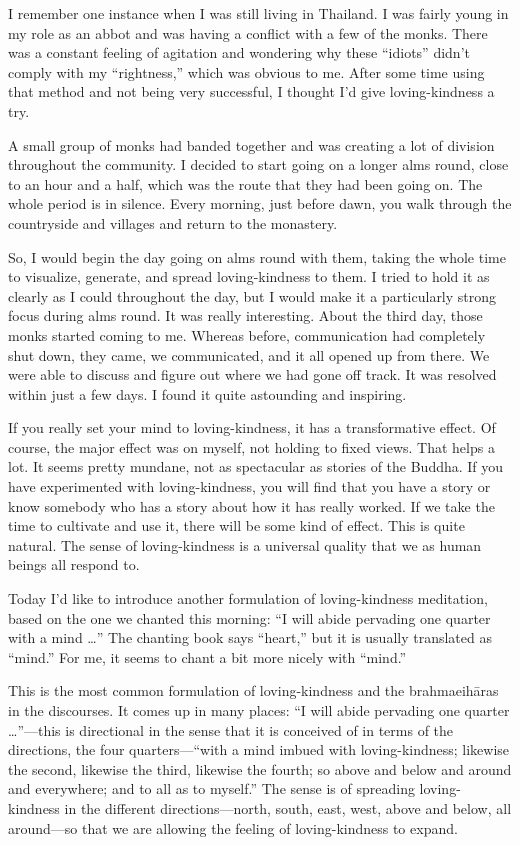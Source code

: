 I remember one instance when I was still living in Thailand. I was
fairly young in my role as an abbot and was having a conflict with a few
of the monks. There was a constant feeling of agitation and wondering
why these “idiots” didn’t comply with my “rightness,” which was obvious
to me. After some time using that method and not being very successful,
I thought I’d give loving-kindness a try.

A small group of monks had banded together and was creating a lot of
division throughout the community. I decided to start going on a longer
alms round, close to an hour and a half, which was the route that they
had been going on. The whole period is in silence. Every morning, just
before dawn, you walk through the countryside and villages and return to
the monastery.

So, I would begin the day going on alms round with them, taking the
whole time to visualize, generate, and spread loving-kindness to them. I
tried to hold it as clearly as I could throughout the day, but I would
make it a particularly strong focus during alms round. It was really
interesting. About the third day, those monks started coming to me.
Whereas before, communication had completely shut down, they came, we
communicated, and it all opened up from there. We were able to discuss
and figure out where we had gone off track. It was resolved within just
a few days. I found it quite astounding and inspiring.

If you really set your mind to loving-kindness, it has a transformative
effect. Of course, the major effect was on myself, not holding to fixed
views. That helps a lot. It seems pretty mundane, not as spectacular as
stories of the Buddha. If you have experimented with loving-kindness,
you will find that you have a story or know somebody who has a story
about how it has really worked. If we take the time to cultivate and use
it, there will be some kind of effect. This is quite natural. The sense
of loving-kindness is a universal quality that we as human beings all
respond to.

Today I’d like to introduce another formulation of loving-kindness
meditation, based on the one we chanted this morning: “I will abide
pervading one quarter with a mind \ldots{}” The chanting book says “heart,”
but it is usually translated as “mind.” For me, it seems to chant a bit
more nicely with “mind.”

This is the most common formulation of loving-kindness and the
brahmaeihāras in the discourses. It comes up in many places: “I will
abide pervading one quarter \ldots{}”—this is directional in the sense that
it is conceived of in terms of the directions, the four quarters—“with a
mind imbued with loving-kindness; likewise the second, likewise the
third, likewise the fourth; so above and below and around and
everywhere; and to all as to myself.” The sense is of spreading
loving-kindness in the different directions—north, south, east, west,
above and below, all around—so that we are allowing the feeling of
loving-kindness to expand.

